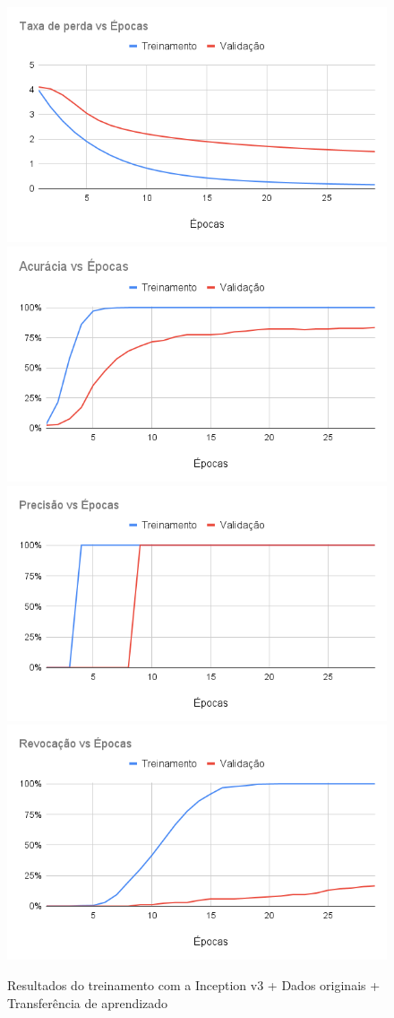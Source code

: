 \documentclass[
	12pt,				%
	oneside,			%
	a4paper,			%
	english,			%
	brazil				%
	]{abntex2ppgsi}
\begin{document}
\begin{figure}[H]
    \centering
    \caption{Resultados do treinamento com a Inception v3 + Dados originais + Transferência de aprendizado}
    \includegraphics[width=.50\textwidth]{imagens/resultados_discussao/architecture/inception_v3/transfer_learning/original/perda.png}\hfill
    \includegraphics[width=.50\textwidth]{imagens/resultados_discussao/architecture/inception_v3/transfer_learning/original/acuracia.png}\bigbreak    \includegraphics[width=.50\textwidth]{imagens/resultados_discussao/architecture/inception_v3/transfer_learning/original/precisao.png}\hfill
    \includegraphics[width=.50\textwidth]{imagens/resultados_discussao/architecture/inception_v3/transfer_learning/original/revocacao.png}
    \label{fig:inception_v3_original_transferencia_aprendizado}
\end{figure}
\end{document}
